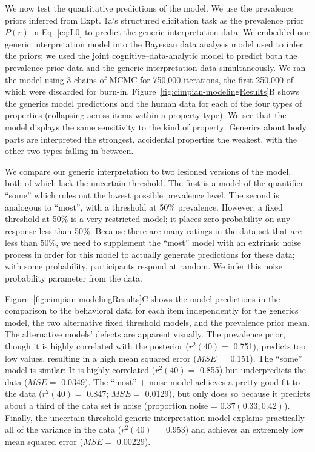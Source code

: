 \documentclass[floatsintext,doc]{apa6}
\theoremstyle{definition}
\theoremstyle{definition}
\theoremstyle{definition}
\theoremstyle{remark}
\begin{document}
We now test the quantitative predictions of the model. We use the
prevalence priors inferred from Expt. 1a's structured elicitation task
as the prevalence prior \(P(r)\) in Eq. \ref{eq:L0} to predict the
generic interpretation data. We embedded our generic interpretation
model into the Bayesian data analysis model used to infer the priors; we
used the joint cognitive--data-analytic model to predict both the
prevalence prior data and the generic interpretation data
simultaneously. 
We ran the model using 3 chains of MCMC for 750,000 iterations, the first 250,000 of which were
discarded for burn-in. Figure~\ref{fig:cimpian-modelingResults}B shows
the generics model predictions and the human data for each of the four
types of properties (collapsing across items within a property-type). We
see that the model displays the same sensitivity to the kind of
property: Generics about body parts are interpreted the strongest,
accidental properties the weakest, with the other two types falling in
between.

We compare our generic interpretation to two lesioned versions of the
model, both of which lack the uncertain threshold. The first is a model
of the quantifier \enquote{some} which rules out the lowest possible
prevalence level. The second is analogous to \enquote{most}, with a
threshold at 50\% prevalence. However, a fixed threshold at 50\% is a
very restricted model; it places zero probability on any response less
than 50\%. Because there are many ratings in the data set that are less
than 50\%, we need to supplement the \enquote{most} model with an
extrinsic noise process in order for this model to actually generate
predictions for these data; with some probability, participants respond
at random. We infer this noise probability parameter from
the data.

Figure~\ref{fig:cimpian-modelingResults}C shows the model predictions in
the comparison to the behavioral data for each item independently for
the generics model, the two alternative fixed threshold models, and the
prevalence prior mean. The alternative models' defects are apparent
visually. The prevalence prior, though it is highly correlated with the
posterior (\(r^2(40)=\) 0.751), predicts too low values, resulting in a
high mean squared error (\(MSE=\) 0.151). The \enquote{some} model is
similar: It is highly correlated (\(r^2(40)=\) 0.855) but underpredicts
the data (\(MSE=\) 0.0349). The \enquote{most} + noise model achieves a
pretty good fit to the data (\(r^2(40) =\) 0.847; \(MSE=\) 0.0129), but
only does so because it predicts about a third of the data set is noise
(proportion noise = \(0.37 (0.33, 0.42)\)). Finally, the uncertain
threshold generic interpretation model explains practically all of the
variance in the data (\(r^2(40) =\) 0.953) and achieves an extremely low
mean squared error (\(MSE =\) 0.00229).
\end{document}
